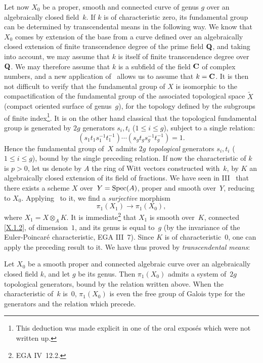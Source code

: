 Let now $X_0$ be a proper, smooth and connected curve of genus $g$
over an algebraically closed field~$k$. If $k$ is of
characteristic zero, its fundamental group can be
determined by transcendental means in the following way. We
know that $X_0$ comes by extension of the base from a curve
defined
over an algebraically closed extension of finite
transcendence degree of the prime field $\mathbf{Q}$, and taking
 into account, we may assume that $k$ is itself of finite
transcendence degree over~$\mathbf{Q}$. We may therefore assume that $k$ is a
subfield of the field $\mathbf{C}$ of complex numbers, and a new
application of~ allows us to assume that $k=\mathbf{C}$. It
is then not difficult to verify that the fundamental group of
$X$ is isomorphic to the compactification of the fundamental group of the
associated topological space $\tilde X$ (compact oriented surface of
genus~$g$), for the topology defined by the subgroups
of finite index\footnote{This deduction was made explicit
in one of the oral expos\'es which were not
written up.}. It is on the other hand classical that the
topological fundamental group is generated by $2g$ generators
$s_i,t_i$ ($1\le i\le g$), subject to a single relation:
$$
(s_1t_1s_1^{-1}t_1^{-1})\cdots(s_gt_gs_g^{-1}t_g^{-1})=1.
$$
Hence the fundamental group of~$X$ admits $2g$ \emph{topological}
generators $s_i,t_i$ ($1\le i\le g$), bound by the single
preceding relation. If now the characteristic of
$k$ is $p>0$, let us denote by $A$ the ring of Witt vectors
constructed with~$k$, by $K$ an algebraically closed extension of
its field of fractions. We have seen in III~ that there
exists a scheme $X$ over~$Y=\operatorname{Spec}(A)$, proper and smooth over~$Y$,
reducing to $X_0$. Applying~ to it, we find a
\emph{surjective} morphism
$$
\pi_1(X_1)\to \pi_1(X_0),
$$
where $X_1=X\otimes_A K$. It is immediate\footnote{\cf EGA
IV~12.2.} that $X_1$ is smooth over~$K$, connected \eqref{X.1.2}, of
dimension~$1$, and its genus is equal to~$g$ (by
the invariance of the Euler-Poincar\'e characteristic, \cf EGA
III~7). Since $K$ is of characteristic~$0$, one can
apply the preceding result to it. We have thus proved by
\emph{transcendental means}:

\begin{theorem}
\label{X.2.6}
Let $X_0$ be a smooth proper and connected algebraic curve over an
algebraically closed field $k$, and let $g$ be its genus. Then
$\pi_1(X_0)$ admits a system of~$2g$ topological
generators, bound by the relation written above. When the
characteristic of~$k$ is~$0$, $\pi_1(X_0)$ is even the
free group of Galois type for the generators and the
relation which precede.
\end{theorem}

